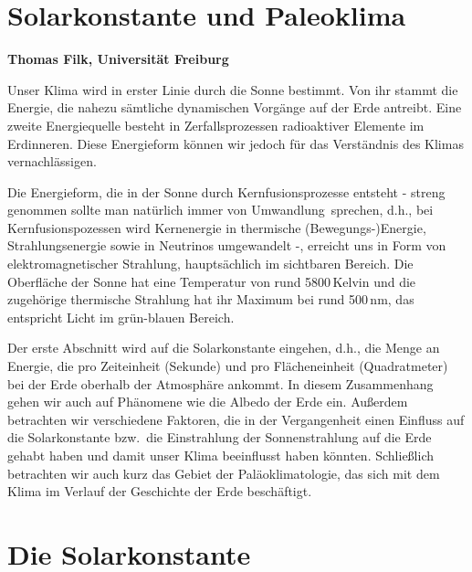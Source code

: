 
\setcounter{page}{1}
\setcounter{section}{0}
\setcounter{figure}{0}
\setcounter{equation}{0}
\setcounter{table}{0}
\setcounter{footnote}{0}

\section*{Solarkonstante und Paleoklima}
\vspace{0.2cm}
\noindent
{\bf Thomas Filk, Universit\"at Freiburg}
\vspace{1cm}

\label{chap_Klima1}
\noindent
Unser Klima wird in erster Linie durch die Sonne bestimmt. Von ihr stammt die Energie,
die nahezu s\"amtliche dynamischen Vorg\"ange auf der Erde antreibt. 
Eine zweite Energiequelle besteht in Zerfallsprozessen radioaktiver Elemente im Erdinneren.
Diese Energieform k\"onnen wir jedoch f\"ur das Verst\"andnis des Klimas vernachl\"assigen.

Die Energieform, die in der Sonne durch Kernfusionsprozesse entsteht - streng genommen sollte
man nat\"urlich immer von \glqq Umwandlung\grqq\ sprechen, d.h., bei Kernfusionspozessen wird
Kernenergie in thermische (Bewegungs-)Energie, Strahlungsenergie sowie in Neutrinos umgewandelt -, 
erreicht uns in Form 
von elektromagnetischer Strahlung, haupts\"achlich im sichtbaren Bereich. Die Oberfl\"ache der
Sonne hat eine Temperatur von rund 5800\,Kelvin und die zugeh\"orige thermische Strahlung
hat ihr Maximum bei rund 500\,nm, das entspricht Licht im gr\"un-blauen Bereich. 

Der erste Abschnitt wird auf die Solarkonstante eingehen, d.h., die Menge an Energie, die pro
Zeiteinheit (Sekunde) und pro Fl\"acheneinheit (Quadratmeter) bei der Erde oberhalb der
Atmosph\"are ankommt. In diesem Zusammenhang gehen wir auch auf Ph\"anomene wie die Albedo
der Erde ein. Au\ss erdem betrachten wir verschiedene Faktoren, die in der Vergangenheit
einen Einfluss auf die Solarkonstante bzw.\ die Einstrahlung der Sonnenstrahlung auf die
Erde gehabt haben und damit unser Klima beeinflusst haben k\"onnten.
Schlie\ss lich betrachten wir auch kurz das Gebiet der Pal\"aoklimatologie, das sich mit
dem Klima im Verlauf der Geschichte der Erde besch\"aftigt. 


\section{Die Solarkonstante}

